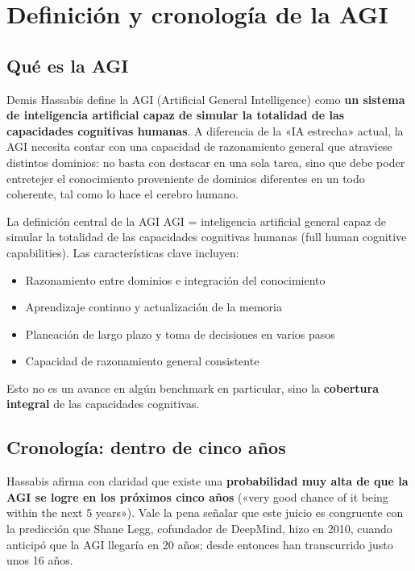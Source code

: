 \section{Definición y cronología de la AGI}

\subsection{Qué es la AGI}

Demis Hassabis define la AGI (Artificial General Intelligence) como \textbf{un sistema de inteligencia artificial capaz de simular la totalidad de las capacidades cognitivas humanas}. A diferencia de la «IA estrecha» actual, la AGI necesita contar con una capacidad de razonamiento general que atraviese distintos dominios: no basta con destacar en una sola tarea, sino que debe poder entretejer el conocimiento proveniente de dominios diferentes en un todo coherente, tal como lo hace el cerebro humano.

\begin{importantbox}{La definición central de la AGI}
AGI = inteligencia artificial general capaz de simular la totalidad de las capacidades cognitivas humanas (full human cognitive capabilities). Las características clave incluyen:
\begin{itemize}
    \item Razonamiento entre dominios e integración del conocimiento
    \item Aprendizaje continuo y actualización de la memoria
    \item Planeación de largo plazo y toma de decisiones en varios pasos
    \item Capacidad de razonamiento general consistente
\end{itemize}
Esto no es un avance en algún benchmark en particular, sino la \textbf{cobertura integral} de las capacidades cognitivas.
\end{importantbox}

\subsection{Cronología: dentro de cinco años}

Hassabis afirma con claridad que existe una \textbf{probabilidad muy alta de que la AGI se logre en los próximos cinco años} («very good chance of it being within the next 5 years»). Vale la pena señalar que este juicio es congruente con la predicción que Shane Legg, cofundador de DeepMind, hizo en 2010, cuando anticipó que la AGI llegaría en 20 años; desde entonces han transcurrido justo unos 16 años.

